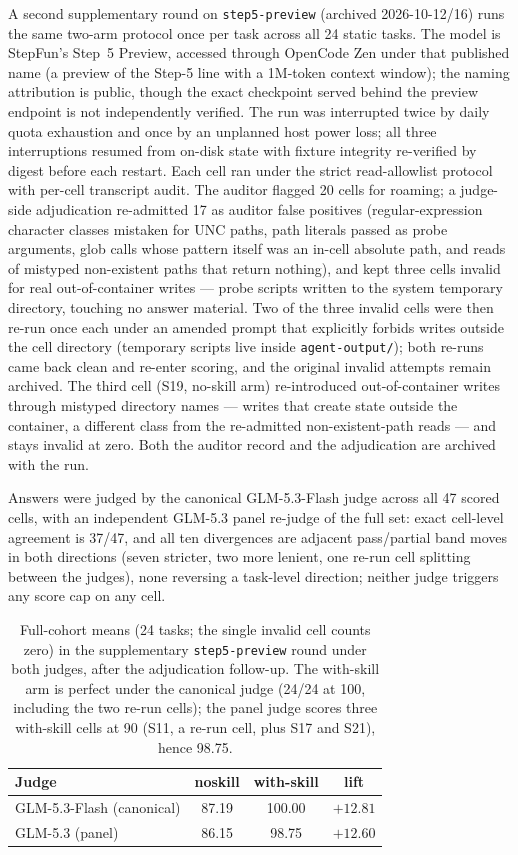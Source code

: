 \documentclass[11pt]{article}
\begin{document}
A second supplementary round on \texttt{step5-preview} (archived 2026-10-12/16) runs the same two-arm protocol once per task across all 24 static tasks. The model is StepFun's Step~5 Preview, accessed through OpenCode Zen under that published name (a preview of the Step-5 line with a 1M-token context window); the naming attribution is public, though the exact checkpoint served behind the preview endpoint is not independently verified. The run was interrupted twice by daily quota exhaustion and once by an unplanned host power loss; all three interruptions resumed from on-disk state with fixture integrity re-verified by digest before each restart. Each cell ran under the strict read-allowlist protocol with per-cell transcript audit. The auditor flagged 20 cells for roaming; a judge-side adjudication re-admitted 17 as auditor false positives (regular-expression character classes mistaken for UNC paths, path literals passed as probe arguments, glob calls whose pattern itself was an in-cell absolute path, and reads of mistyped non-existent paths that return nothing), and kept three cells invalid for real out-of-container writes --- probe scripts written to the system temporary directory, touching no answer material. Two of the three invalid cells were then re-run once each under an amended prompt that explicitly forbids writes outside the cell directory (temporary scripts live inside \texttt{agent-output/}); both re-runs came back clean and re-enter scoring, and the original invalid attempts remain archived. The third cell (S19, no-skill arm) re-introduced out-of-container writes through mistyped directory names --- writes that create state outside the container, a different class from the re-admitted non-existent-path reads --- and stays invalid at zero. Both the auditor record and the adjudication are archived with the run.

Answers were judged by the canonical GLM-5.3-Flash judge across all 47 scored cells, with an independent GLM-5.3 panel re-judge of the full set: exact cell-level agreement is 37/47, and all ten divergences are adjacent pass/partial band moves in both directions (seven stricter, two more lenient, one re-run cell splitting between the judges), none reversing a task-level direction; neither judge triggers any score cap on any cell.

\begin{table}[t]
\centering
\small
\begin{tabular}{lccc}
\toprule
Judge & noskill & with-skill & lift \\
\midrule
GLM-5.3-Flash (canonical) & 87.19 & 100.00 & $+12.81$ \\
GLM-5.3 (panel) & 86.15 & 98.75 & $+12.60$ \\
\bottomrule
\end{tabular}
\caption{Full-cohort means (24 tasks; the single invalid cell counts zero) in the supplementary \texttt{step5-preview} round under both judges, after the adjudication follow-up. The with-skill arm is perfect under the canonical judge (24/24 at 100, including the two re-run cells); the panel judge scores three with-skill cells at 90 (S11, a re-run cell, plus S17 and S21), hence 98.75.}
\label{tab:step5_means}
\end{table}
\end{document}
